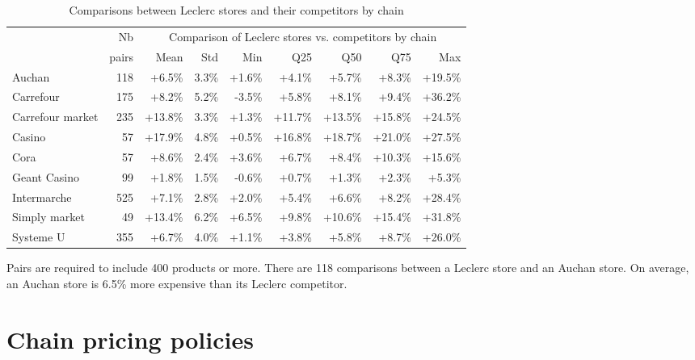 \documentclass[english]{article}
\begin{document}
\begin{table}[H]
\begin{threeparttable}
\renewcommand{\arraystretch}{0.7}%
\caption{Comparisons between Leclerc stores and their competitors by chain}\label{tab:qlmc_store_comparisons}
\small
\begin{tabular}{lr|rrrrrrr}
\toprule
\toprule
          & Nb    & \multicolumn{7}{c}{Comparison of Leclerc stores vs. competitors by chain} \\
          & pairs & Mean  & Std   & Min   & Q25  & Q50 & Q75  & Max \\
\midrule
    Auchan & 118   & +6.5\% & 3.3\% & +1.6\% & +4.1\% & +5.7\% & +8.3\% & +19.5\% \\
    Carrefour & 175   & +8.2\% & 5.2\% & -3.5\% & +5.8\% & +8.1\% & +9.4\% & +36.2\% \\
    Carrefour market & 235   & +13.8\% & 3.3\% & +1.3\% & +11.7\% & +13.5\% & +15.8\% & +24.5\% \\
    Casino & 57    & +17.9\% & 4.8\% & +0.5\% & +16.8\% & +18.7\% & +21.0\% & +27.5\% \\
    Cora  & 57    & +8.6\% & 2.4\% & +3.6\% & +6.7\% & +8.4\% & +10.3\% & +15.6\% \\
    Geant Casino & 99    & +1.8\% & 1.5\% & -0.6\% & +0.7\% & +1.3\% & +2.3\% & +5.3\% \\
    Intermarche & 525   & +7.1\% & 2.8\% & +2.0\% & +5.4\% & +6.6\% & +8.2\% & +28.4\% \\
    Simply market & 49    & +13.4\% & 6.2\% & +6.5\% & +9.8\% & +10.6\% & +15.4\% & +31.8\% \\
    Systeme U & 355   & +6.7\% & 4.0\% & +1.1\% & +3.8\% & +5.8\% & +8.7\% & +26.0\% \\
\bottomrule
\bottomrule
\end{tabular}
\begin{tablenotes}
      \small
      \item Pairs are required to include 400 products or more. There are 118 comparisons between a Leclerc store and an Auchan store. On average, an Auchan store is 6.5\% more expensive than its Leclerc competitor.
\end{tablenotes}
\end{threeparttable}
\end{table}

\newpage

\section{Chain pricing policies}
\end{document}

